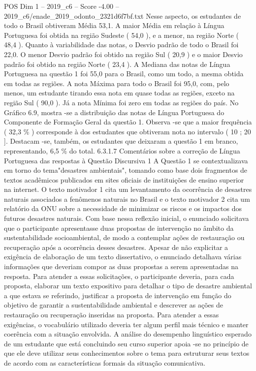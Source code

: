 \begin{textsample}{POS Dim 1 – 2019\_c6 – Score -4.00 – 2019\_c6/enade\_2019\_odonto\_2321d6f7bf.txt}
Nesse aspecto, os estudantes de todo o Brasil obtiveram Média 53,1.
A maior Média em relação à Língua Portuguesa foi obtida na região Sudeste ( 54,0 ), e a menor, na região Norte ( 48,4 ).
Quanto à variabilidade das notas, o Desvio padrão de todo o Brasil foi 22,0.
O menor Desvio padrão foi obtido na região Sul ( 20,9 ) e o maior Desvio padrão foi obtido na região Norte ( 23,4 ).
A Mediana das notas de Língua Portuguesa na questão 1 foi 55,0 para o Brasil, como um todo, a mesma obtida em todas as regiões.
A nota Máxima para todo o Brasil foi 95,0, com, pelo menos, um estudante tirando essa nota em quase todas as regiões, exceto na região Sul ( 90,0 ).
Já a nota Mínima foi zero em todas as regiões do país.
No Gráfico 6.9, mostra -se a distribuição das notas de Língua Portuguesa do Componente de Formação Geral da questão 1.
Observa -se que a maior frequência ( 32,3 \% ) corresponde à dos estudantes que obtiveram nota no intervalo ( 10 ; 20 ].
Destacam -se, também, os estudantes que deixaram a questão 1 em branco, representando, 6,5 \% do total. 6.3.1.7 Comentários sobre a correção de Língua Portuguesa das respostas à Questão Discursiva 1 A Questão 1 se contextualizava em torno do tema"desastres ambientais", tomando como base dois fragmentos de textos acadêmicos publicados em sites oficiais de instituições de ensino superior na internet.
O texto motivador 1 cita um levantamento da ocorrência de desastres naturais associados a fenômenos naturais no Brasil e o texto motivador 2 cita um relatório da ONU sobre a necessidade de minimizar os riscos e os impactos dos futuros desastres naturais.
Com base nessa reflexão inicial, o enunciado solicitava que o participante apresentasse duas propostas de intervenção no âmbito da sustentabilidade socioambiental, de modo a contemplar ações de restauração ou recuperação após a ocorrência desses desastres.
Apesar de não explicitar a exigência de elaboração de um texto dissertativo, o enunciado detalhava várias informações que deveriam compor as duas propostas a serem apresentadas na resposta.
Para atender a essas solicitações, o participante deveria, para cada proposta, elaborar um texto expositivo para detalhar o tipo de desastre ambiental a que estava se referindo, justificar a proposta de intervenção em função do objetivo de garantir a sustentabilidade ambiental e descrever as ações de restauração ou recuperação inseridas na proposta.
Para atender a essas exigências, o vocabulário utilizado deveria ter algum perfil mais técnico e manter coerência com a situação envolvida.
A análise do desempenho linguístico esperado de um estudante que está concluindo seu curso superior apoia -se no princípio de que ele deve utilizar seus conhecimentos sobre o tema para estruturar seus textos de acordo com as características formais da situação comunicativa.

\end{textsample}
